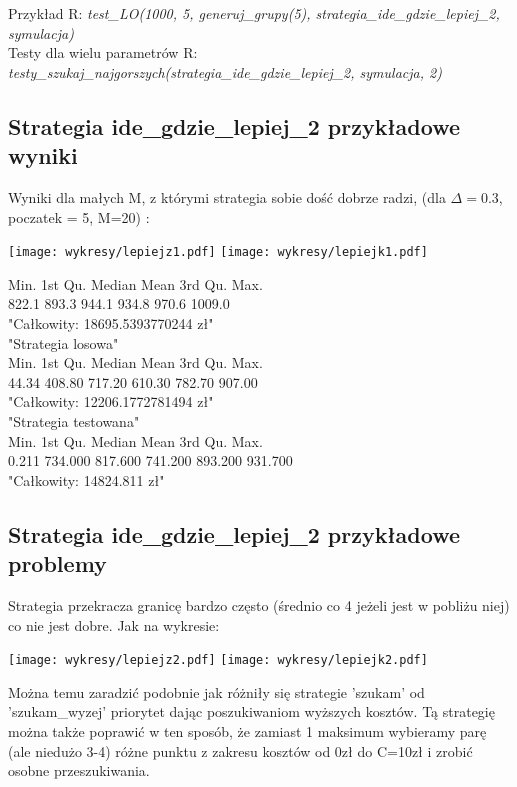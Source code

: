 \documentclass{article}
\begin{document}
Przykład R: \textit{test\_LO(1000, 5, generuj\_grupy(5), strategia\_ide\_gdzie\_lepiej\_2, symulacja)}\\
Testy dla wielu parametrów R: \textit{testy\_szukaj\_najgorszych(strategia\_ide\_gdzie\_lepiej\_2, symulacja, 2)}\\

\subsection{Strategia ide\_gdzie\_lepiej\_2 przykładowe wyniki}
Wyniki dla małych M, z którymi strategia sobie dość dobrze radzi, (dla $\Delta = 0.3$, poczatek = 5, M=20) :
\begin{center}
\texttt{[image: wykresy/lepiejz1.pdf]}
\texttt{[image: wykresy/lepiejk1.pdf]}
\end{center}

   Min. 1st Qu.  Median    Mean 3rd Qu.    Max. \\
  822.1   893.3   944.1   934.8   970.6  1009.0 \\
"Całkowity:  18695.5393770244 zł"\\
"Strategia losowa"\\
   Min. 1st Qu.  Median    Mean 3rd Qu.    Max. \\
  44.34  408.80  717.20  610.30  782.70  907.00 \\
"Całkowity:  12206.1772781494 zł"\\
"Strategia testowana"\\
   Min. 1st Qu.  Median    Mean 3rd Qu.    Max. \\
  0.211 734.000 817.600 741.200 893.200 931.700 \\
"Całkowity:  14824.811 zł"\\

\subsection{Strategia ide\_gdzie\_lepiej\_2 przykładowe problemy}
Strategia przekracza granicę bardzo często (średnio co 4 jeżeli jest w pobliżu niej) co nie jest dobre. Jak na wykresie:
\begin{center}
\texttt{[image: wykresy/lepiejz2.pdf]}
\texttt{[image: wykresy/lepiejk2.pdf]}
\end{center}

Można temu zaradzić 
podobnie jak różniły się strategie 'szukam' od 'szukam\_wyzej' priorytet dając poszukiwaniom wyższych kosztów.
Tą strategię można także poprawić w ten sposób, że zamiast 1 maksimum wybieramy parę (ale niedużo 3-4) różne punktu z zakresu
kosztów od 0zł do C=10zł i zrobić osobne przeszukiwania.
\end{document}
